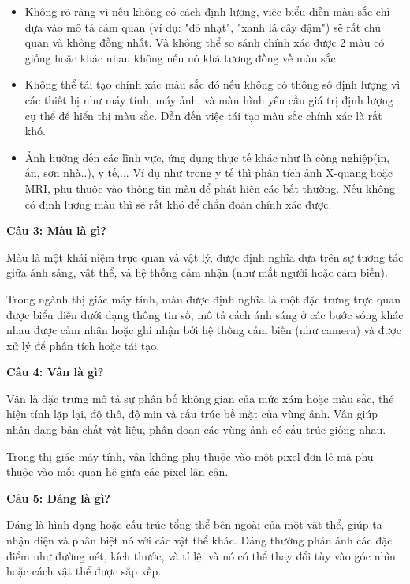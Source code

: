 \begin{itemize}
	\item Không rõ ràng vì nếu không có cách định lượng, việc biểu diễn màu sắc chỉ dựa vào mô tả cảm quan (ví dụ: "đỏ nhạt", "xanh lá cây đậm") sẽ rất chủ quan và không đồng nhất. Và không thể so sánh chính xác được 2 màu có giống hoặc khác nhau không nếu nó khá tương đồng về màu sắc.
	
	\item Không thể tái tạo chính xác màu sắc đó nếu không có thông số định lượng vì các thiết bị như máy tính, máy ảnh, và màn hình yêu cầu giá trị định lượng cụ thể để hiển thị màu sắc. Dẫn đến việc tái tạo màu sắc chính xác là rất khó.
	
	\item Ảnh hưởng đến các lĩnh vực, ứng dụng thực tế khác như là công nghiệp(in, ấn, sơn nhà..), y tế,... Ví dụ như trong y tế thì phân tích ảnh X-quang hoặc MRI, phụ thuộc vào thông tin màu để phát hiện các bất thường. Nếu không có định lượng màu thì sẽ rất khó để chẩn đoán chính xác được.
\end{itemize}

\textbf{Câu 3: Màu là gì?}

Màu là một khái niệm trực quan và vật lý, được định nghĩa dựa trên sự tương tác giữa ánh sáng, vật thể, và hệ thống cảm nhận (như mắt người hoặc cảm biến).

Trong ngành thị giác máy tính, màu được định nghĩa là một đặc trưng trực quan được biểu diễn dưới dạng thông tin số, mô tả cách ánh sáng ở các bước sóng khác nhau được cảm nhận hoặc ghi nhận bởi hệ thống cảm biến (như camera) và được xử lý để phân tích hoặc tái tạo.

\textbf{Câu 4: Vân là gì?}

Vân là đặc trưng mô tả sự phân bố không gian của mức xám hoặc màu sắc, thể hiện tính lặp lại, độ thô, độ mịn và cấu trúc bề mặt của vùng ảnh. Vân giúp nhận dạng bản chất vật liệu, phân đoạn các vùng ảnh có cấu trúc giống nhau.

Trong thị giác máy tính, vân không phụ thuộc vào một pixel đơn lẻ mà phụ thuộc vào mối quan hệ giữa các pixel lân cận.

\textbf{Câu 5: Dáng là gì?}

Dáng là hình dạng hoặc cấu trúc tổng thể bên ngoài của một vật thể, giúp ta nhận diện và phân biệt nó với các vật thể khác. Dáng thường phản ánh các đặc điểm như đường nét, kích thước, và tỉ lệ, và nó có thể thay đổi tùy vào góc nhìn hoặc cách vật thể được sắp xếp.

